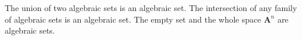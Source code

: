 The union of two algebraic sets is an algebraic set. The intersection of any family of algebraic sets is an algebraic set. The empty set and the whole space $\mathbf{A}^n$ are algebraic sets.
